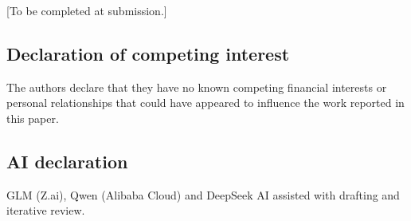 \documentclass[11pt]{article}
\begin{document}
{[}To be completed at submission.{]}

\subsection*{Declaration of competing interest}

The authors declare that they have no known competing financial
interests or personal relationships that could have appeared to
influence the work reported in this paper.

\subsection*{AI declaration}
GLM (Z.ai), Qwen (Alibaba Cloud) and DeepSeek AI assisted with drafting and iterative review.
\end{document}
